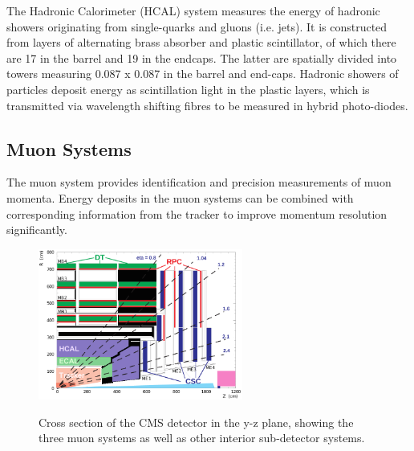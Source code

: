 The Hadronic Calorimeter (HCAL) system measures the energy of hadronic showers 
originating from single-quarks and gluons (i.e. jets). It is constructed from
layers of alternating brass absorber and plastic scintillator, of which there
are 17 in the barrel and 19 in the endcaps. The latter are spatially
divided into towers measuring 0.087 x 0.087 in the barrel and end-caps. Hadronic
showers of particles deposit energy as scintillation light in the plastic layers,
which is transmitted via wavelength shifting fibres to be measured in hybrid
photo-diodes. 


\subsection{Muon Systems}


The muon system provides identification and precision measurements of
muon momenta. Energy deposits in the muon systems can be combined with 
corresponding information from the tracker to improve momentum resolution
significantly.

\begin{figure}[ht!]
\centering
\includegraphics[width=0.6\textwidth]{Figs/machine/pictures_MuonSys-mod3.png}
\label{fig:muon_system_diagram}
\caption{Cross section of the CMS detector in the y-z plane, showing the three 
muon systems as well as other interior sub-detector systems.}
\end{figure}

